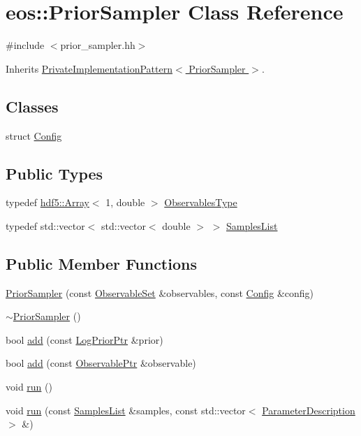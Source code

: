 \hypertarget{classeos_1_1PriorSampler}{
\section{eos::PriorSampler Class Reference}
\label{classeos_1_1PriorSampler}
}


{\ttfamily \#include $<$prior\_\-sampler.hh$>$}

Inherits \hyperlink{classeos_1_1PrivateImplementationPattern}{PrivateImplementationPattern$<$ PriorSampler $>$}.\subsection*{Classes}
\begin{DoxyCompactItemize}
\item 
struct \hyperlink{structeos_1_1PriorSampler_1_1Config}{Config}
\end{DoxyCompactItemize}
\subsection*{Public Types}
\begin{DoxyCompactItemize}
\item 
typedef \hyperlink{classeos_1_1hdf5_1_1Array}{hdf5::Array}$<$ 1, double $>$ \hyperlink{classeos_1_1PriorSampler_a7ae349c306b96abd4507bd2ea2e14b86}{ObservablesType}
\item 
typedef std::vector$<$ std::vector$<$ double $>$ $>$ \hyperlink{classeos_1_1PriorSampler_a6da96aefb4891f1acb9366c8ffccd223}{SamplesList}
\end{DoxyCompactItemize}
\subsection*{Public Member Functions}
\begin{DoxyCompactItemize}
\item 
\hyperlink{classeos_1_1PriorSampler_afa682fec47cec9d61b44709b1e8f4ea3}{PriorSampler} (const \hyperlink{classeos_1_1ObservableSet}{ObservableSet} \&observables, const \hyperlink{structeos_1_1PriorSampler_1_1Config}{Config} \&config)
\item 
\hyperlink{classeos_1_1PriorSampler_ad58ef7a11610b6c0bbbec96a9189395f}{$\sim$PriorSampler} ()
\item 
bool \hyperlink{classeos_1_1PriorSampler_aedf28860d2238779355f6fd583555851}{add} (const \hyperlink{namespaceeos_ac5481e3b46ee55ff24606ee7f6e78651}{LogPriorPtr} \&prior)
\item 
bool \hyperlink{classeos_1_1PriorSampler_ad402bbf857e13b0ce3c6af174e8c72dd}{add} (const \hyperlink{namespaceeos_a470e5dd806bd129080f1aa0c2954646f}{ObservablePtr} \&observable)
\item 
void \hyperlink{classeos_1_1PriorSampler_a62210b9eb8835714166f9ce2689685e3}{run} ()
\item 
void \hyperlink{classeos_1_1PriorSampler_a610cb408ecf74f29d8632c3b5b264c91}{run} (const \hyperlink{classeos_1_1PriorSampler_a6da96aefb4891f1acb9366c8ffccd223}{SamplesList} \&samples, const std::vector$<$ \hyperlink{structeos_1_1ParameterDescription}{ParameterDescription} $>$ \&)
\end{DoxyCompactItemize}
